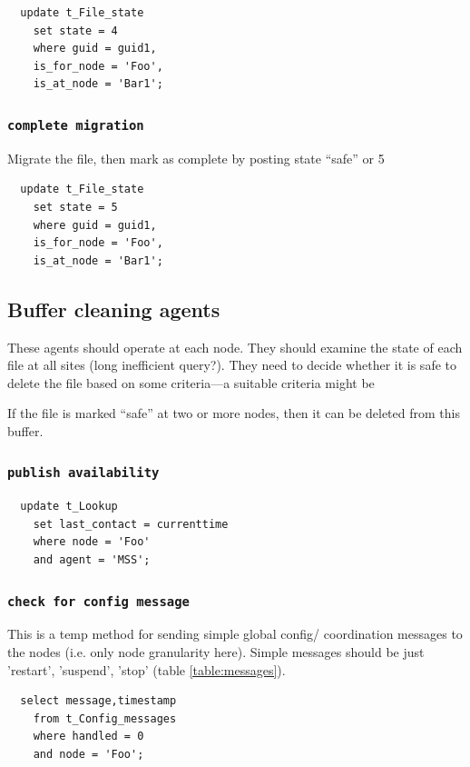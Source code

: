 \documentclass{cmspaper}
\begin{document}
{\small\begin{verbatim}
  update t_File_state
    set state = 4
    where guid = guid1,
    is_for_node = 'Foo',
    is_at_node = 'Bar1';
\end{verbatim}}

\subsubsection{\textbf{\texttt{complete migration}}}
Migrate the file, then mark as complete by posting state ``safe'' or 5

{\small\begin{verbatim}
  update t_File_state
    set state = 5
    where guid = guid1,
    is_for_node = 'Foo',
    is_at_node = 'Bar1';
\end{verbatim}}


\subsection{Buffer cleaning agents}

These agents should operate at each node. They should examine the
state of each file at all sites (long inefficient query?). They need
to decide whether it is safe to delete the file based on some
criteria---a suitable criteria might be

If the file is marked ``safe'' at two or more nodes, then it can be
deleted from this buffer.

\subsubsection{\textbf{\texttt{publish availability}}}

{\small\begin{verbatim}
  update t_Lookup
    set last_contact = currenttime
    where node = 'Foo'
    and agent = 'MSS';
\end{verbatim}}

\subsubsection{\textbf{\texttt{check for config message}}}
This is a temp method for sending simple global config/ coordination messages to the nodes (i.e. only node granularity here). Simple messages should be just 'restart', 'suspend', 'stop' (table \ref{table:messages}).

{\small\begin{verbatim}
  select message,timestamp
  	from t_Config_messages
  	where handled = 0
  	and node = 'Foo';
\end{verbatim}}
\end{document}
